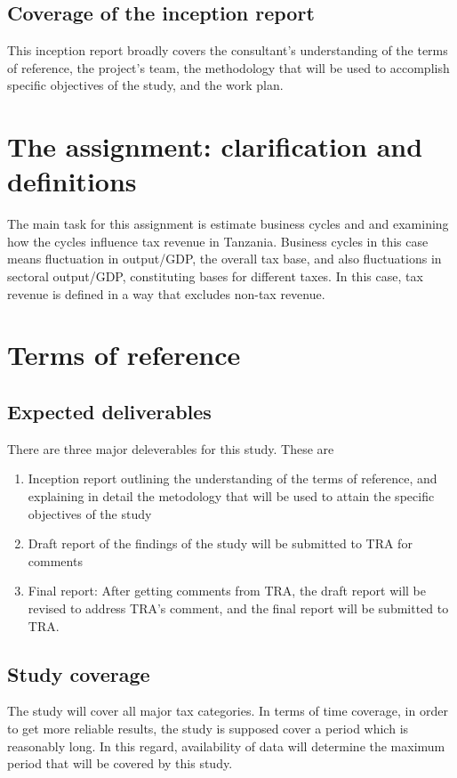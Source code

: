 \documentclass[12pt,a4paper,final]{article}
\begin{document}
\subsection{Coverage of the inception report}
This inception report broadly covers the consultant's understanding of the terms of reference, the project's team, the methodology that will be used to accomplish specific objectives of the study, and the work plan.

\section{The assignment: clarification and definitions}
The main task for this assignment is estimate business cycles and and examining how the cycles influence tax revenue in Tanzania.  Business cycles in this case means fluctuation in output/GDP, the overall tax base, and also fluctuations in sectoral output/GDP, constituting bases for different taxes. In this case, tax revenue is defined in a way that excludes non-tax revenue.

\section{Terms of reference}

\subsection{Expected deliverables}

There are three major deleverables for this study. These are 

\begin{enumerate}
\item Inception report outlining the understanding of the terms of reference, and explaining in detail the metodology that will be used to attain the specific objectives of the study
\item Draft report of the findings of the study will be submitted to TRA for comments
\item Final report: After getting comments from TRA, the draft report will be revised to address TRA's comment, and the final report will be submitted to TRA.
\end{enumerate}

\subsection{Study coverage}
The study will cover all major tax categories. In terms of time coverage, in order to get more reliable results, the study is supposed cover a period which is reasonably long.  In this regard, availability of data will determine the maximum period that will be covered by this study.
 
\end{document}
